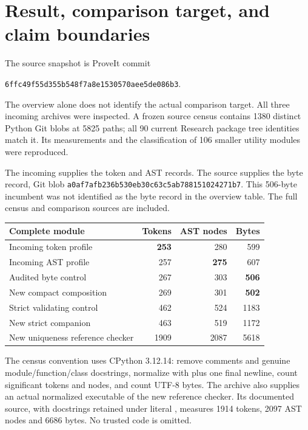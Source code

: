\section{Result, comparison target, and claim boundaries}
The source snapshot is ProveIt commit
\begin{center}\small\texttt{6ffc49f55d355b548f7a8e1530570aee5de086b3}.\end{center}
The overview alone does not identify the actual comparison target.
All three incoming archives were inspected. A frozen source census
contains 1380 distinct Python Git blobs at 5825 paths; all 90 current
Research package tree identities match it. Its measurements and the
classification of 106 smaller utility modules were reproduced.

The incoming  supplies the token and AST
records. The source
supplies the byte record, Git blob
\texttt{a0af7afb236b530eb30c63c5ab788151024271b7}.
This 506-byte incumbent was not identified as the byte record in the
overview table. The full census and comparison sources are included.

\begin{center}
\begin{tabular}{lrrr}
\toprule
Complete module & Tokens & AST nodes & Bytes\\
\midrule
Incoming token profile & \textbf{253} & 280 & 599\\
Incoming AST profile & 257 & \textbf{275} & 607\\
Audited byte control & 267 & 303 & \textbf{506}\\
New compact composition & 269 & 301 & \textbf{502}\\
Strict validating control & 462 & 524 & 1183\\
New strict companion & 463 & 519 & 1172\\
New uniqueness reference checker & 1909 & 2087 & 5618\\
\bottomrule
\end{tabular}
\end{center}

The census convention uses CPython 3.12.14: remove comments and genuine
module/function/class docstrings, normalize with  plus
one final newline, count significant tokens and  nodes,
and count UTF-8 bytes. The archive also supplies an actual normalized
executable of the new reference checker. Its documented source, with
docstrings retained under literal , measures
1914 tokens, 2097 AST nodes and 6686 bytes. No trusted code is omitted.

